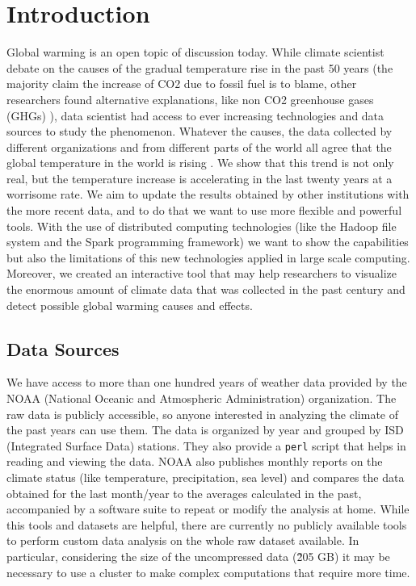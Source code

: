 \documentclass{vldb}
\begin{document}
\maketitle

\begin{abstract}


\end{abstract}

\section{Introduction}
\label{sec:intro}
Global warming is an open topic of discussion today. While climate scientist debate on the causes of the gradual temperature rise in the past 50 years (the majority claim the increase of CO2 due to fossil fuel is to blame, other researchers found alternative explanations, like non CO2 greenhouse gases (GHGs) \cite{hansen2000global}), data scientist had access to ever increasing technologies and data sources to study the phenomenon. Whatever the causes, the data collected by different organizations and from different parts of the world all agree that the global temperature in the world is rising \cite{hansen2006global}. We show that this trend is not only real, but the temperature increase is accelerating in the last twenty years at a worrisome rate. We aim to update the results obtained by other institutions with the more recent data, and to do that we want to use more flexible and powerful tools. With the use of distributed computing technologies (like the Hadoop file system and the Spark programming framework) we want to show the capabilities but also the limitations of this new technologies applied in large scale computing. Moreover, we created an interactive tool that may help researchers to visualize the enormous amount of climate data that was collected in the past century and detect possible global warming causes and effects.

\subsection{Data Sources}
We have access to more than one hundred years of weather data provided by the NOAA (National Oceanic and Atmospheric Administration) organization. The raw data is publicly accessible\cite{noaa}, so anyone interested in analyzing the climate of the past years can use them. The data is organized by year and grouped by ISD (Integrated Surface Data) stations. They also provide a \texttt{perl} script that helps in reading and viewing the data. NOAA also publishes monthly reports on the climate status (like temperature, precipitation, sea level) and compares the data obtained for the last month/year to the averages calculated in the past, accompanied by a software suite to repeat or modify the analysis at home. While this tools and datasets are helpful, there are currently no publicly available tools to perform custom data analysis on the whole raw dataset available. In particular, considering the size of the uncompressed data (\~205 GB) it may be necessary to use a cluster to make complex computations that require more time. \\
\end{document}
